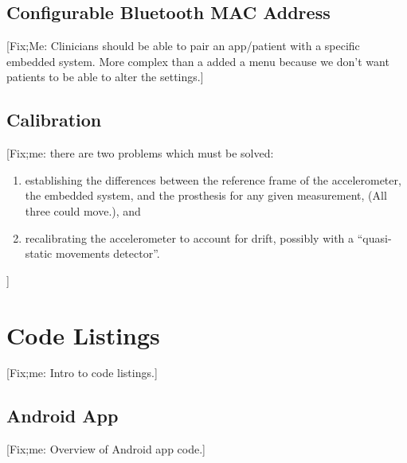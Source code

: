 \documentclass[11pt, a4paper, oneside, english]{scrbook}
\begin{document}
\section{Configurable Bluetooth MAC Address} %
\label{sec:configurable_bluetooth_mac_adress}
[Fix;Me: Clinicians should be able to pair an app/patient with a specific embedded system. More complex than a added a menu because we don't want patients to be able to alter the settings.]
\section{Calibration} %
\label{sec:calibration}
[Fix;me: there are two problems which must be solved:
\begin{enumerate}
\item establishing the differences between the reference frame of the accelerometer, the embedded system, and the prosthesis for any given measurement, (All three could move.), and
\item recalibrating the accelerometer to account for drift, possibly with a ``quasi-static movements detector''.
\end{enumerate}]
\chapter{Code Listings} %
\label{cha:code_listings}
[Fix;me: Intro to code listings.]
\section{Android App} %
\label{sec:android_app}
[Fix;me: Overview of Android app code.]

\newpage

\newpage

\newpage



\end{document}
